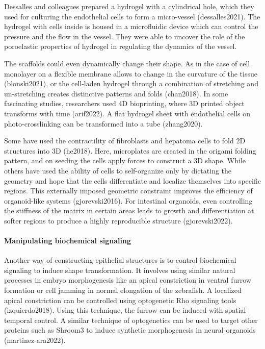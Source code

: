 \documentclass[
]{article}
\begin{document}
Dessalles and colleagues prepared a hydrogel with a cylindrical hole,
which they used for culturing the endothelial cells to form a
micro-vessel (dessalles2021). The hydrogel with cells inside is housed
in a microfluidic device which can control the pressure and the flow in
the vessel. They were able to uncover the role of the poroelastic
properties of hydrogel in regulating the dynamics of the vessel.

The scaffolds could even dynamically change their shape. As in the case
of cell monolayer on a flexible membrane allows to change in the
curvature of the tissue (blonski2021), or the cell-laden hydrogel
through a combination of stretching and un-stretching creates
distinctive patterns and folds (chan2018). In some fascinating studies,
researchers used 4D bioprinting, where 3D printed object transforms with
time (arif2022). A flat hydrogel sheet with endothelial cells on
photo-crosslinking can be transformed into a tube (zhang2020).

Some have used the contractility of fibroblasts and hepatoma cells to
fold 2D structures into 3D (he2018). Here, microplates are created in
the origami folding pattern, and on seeding the cells apply forces to
construct a 3D shape. While others have used the ability of cells to
self-organize only by dictating the geometry and hope that the cells
differentiate and localize themselves into specific regions. This
externally imposed geometric constraint improves the efficiency of
organoid-like systems (gjorevski2016). For intestinal organoids, even
controlling the stiffness of the matrix in certain areas leads to growth
and differentiation at softer regions to produce a highly reproducible
structure (gjorevski2022).

\hypertarget{manipulating-biochemical-signaling}{%
\paragraph{Manipulating biochemical
signaling}\label{manipulating-biochemical-signaling}}

Another way of constructing epithelial structures is to control
biochemical signaling to induce shape transformation. It involves using
similar natural processes in embryo morphogenesis like an apical
constriction in ventral furrow formation or cell jamming in normal
elongation of the zebrafish. A localized apical constriction can be
controlled using optogenetic Rho signaling tools (izquierdo2018). Using
this technique, the furrow can be induced with spatial temporal control.
A similar technique of optogenetics can be used to target other proteins
such as Shroom3 to induce synthetic morphogenesis in neural organoids
(martinez-ara2022).
\end{document}
